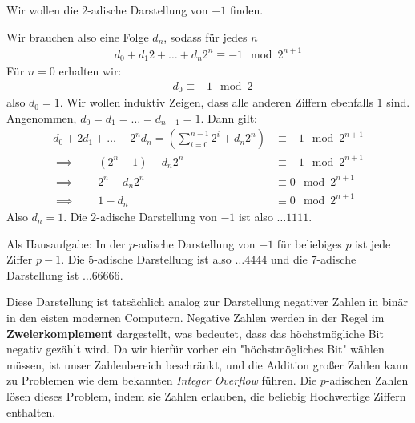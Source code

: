 \documentclass{report}
\newcommand*{\newpar}{\par\vspace{\baselineskip}\noindent}
\newcommand{\tbf}[1]{\textbf{#1}}
\begin{document}
	\begin{example}
		Wir wollen die $2$-adische Darstellung von $-1$ finden.
		\newpar
		Wir brauchen also eine Folge $d_n$, sodass für jedes $n$
		\begin{align*}
			d_0 + d_1 2 + \hdots + d_n 2^n \equiv -1 \mod 2^{n+1}
		\end{align*}
		Für $n = 0$ erhalten wir:
		\begin{align*}
			-d_0 \equiv -1 \mod 2
		\end{align*}
		also $d_0 = 1$. Wir wollen induktiv Zeigen, dass alle anderen Ziffern ebenfalls $1$ sind. Angenommen, $d_0 = d_1 = \hdots = d_{n-1} = 1$. Dann gilt:
		\begin{align*}
			d_0 + 2d_1 + \hdots + 2^nd_n  = \left(\sum_{i = 0}^{n-1} 2^i + d_n 2^n\right) 
			&\equiv -1 \mod 2^{n+1}\\
			\implies \qquad (2^n - 1) - d_n 2^n &\equiv -1 \mod 2^{n+1}\\
			\implies \qquad 2^n - d_n 2^n  &\equiv 0 \mod 2^{n+1}\\
			\implies \qquad 1 - d_n &\equiv 0 \mod 2^{n+1}
		\end{align*}
		Also $d_n = 1$. Die $2$-adische Darstellung von $-1$ ist also $\hdots1111$.
	\end{example}
	\begin{proposition}
		Als Hausaufgabe: In der $p$-adische Darstellung von $-1$ für beliebiges $p$ ist jede Ziffer $p-1$. Die $5$-adische Darstellung ist also $\hdots4444$ und die $7$-adische Darstellung ist $\hdots66666$.
	\end{proposition}
	\noindent Diese Darstellung ist tatsächlich analog zur Darstellung negativer Zahlen in binär in den eisten modernen Computern. Negative Zahlen werden in der Regel im \tbf{Zweierkomplement} dargestellt, was bedeutet, dass das höchstmögliche Bit negativ gezählt wird. Da wir hierfür vorher ein "höchstmögliches Bit" wählen müssen, ist unser Zahlenbereich beschränkt, und die Addition großer Zahlen kann zu Problemen wie dem bekannten \textit{Integer Overflow} führen. Die $p$-adischen Zahlen lösen dieses Problem, indem sie Zahlen erlauben, die beliebig Hochwertige Ziffern enthalten.
\end{document}
